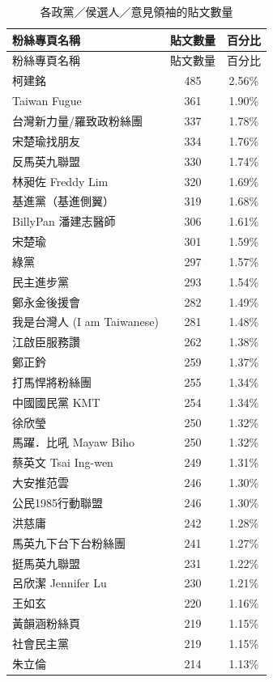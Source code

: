 \documentclass[a4paper, 10pt, conference]{ieeeconf}       %
\begin{document}
\begin{CJK}{UTF8}{bsmi}
\onecolumn

\begin{longtable}[c]{@{}lcc@{}}
\caption{各政黨／侯選人／意見領袖的貼文數量}
\label{t1}\\
\toprule
粉絲專頁名稱 & 貼文數量 & 百分比 \\* \midrule
\endfirsthead
\toprule
粉絲專頁名稱 & 貼文數量 & 百分比 \\* \midrule
\endhead
%
\bottomrule
\endfoot
%
\endlastfoot
%
柯建銘 & 485 & 2.56\% \\
Taiwan Fugue & 361 & 1.90\% \\
台灣新力量/羅致政粉絲團 & 337 & 1.78\% \\
宋楚瑜找朋友 & 334 & 1.76\% \\
反馬英九聯盟 & 330 & 1.74\% \\
林昶佐 Freddy Lim & 320 & 1.69\% \\
基進黨（基進側翼） & 319 & 1.68\% \\
BillyPan 潘建志醫師 & 306 & 1.61\% \\
宋楚瑜 & 301 & 1.59\% \\
綠黨 & 297 & 1.57\% \\
民主進步黨 & 293 & 1.54\% \\
鄭永金後援會 & 282 & 1.49\% \\
我是台灣人 (I am Taiwanese) & 281 & 1.48\% \\
江啟臣服務讚 & 262 & 1.38\% \\
鄭正鈐 & 259 & 1.37\% \\
打馬悍將粉絲團 & 255 & 1.34\% \\
中國國民黨 KMT & 254 & 1.34\% \\
徐欣瑩 & 250 & 1.32\% \\
馬躍．比吼 Mayaw Biho & 250 & 1.32\% \\
蔡英文 Tsai Ing-wen & 249 & 1.31\% \\
大安推范雲 & 246 & 1.30\% \\
公民1985行動聯盟 & 246 & 1.30\% \\
洪慈庸 & 242 & 1.28\% \\
馬英九下台下台粉絲團 & 241 & 1.27\% \\
挺馬英九聯盟 & 231 & 1.22\% \\
呂欣潔 Jennifer Lu & 230 & 1.21\% \\
王如玄 & 220 & 1.16\% \\
黃韻涵粉絲頁 & 219 & 1.15\% \\
社會民主黨 & 219 & 1.15\% \\
朱立倫 & 214 & 1.13\% \\

\end{longtable}
\end{CJK}
\end{document}
